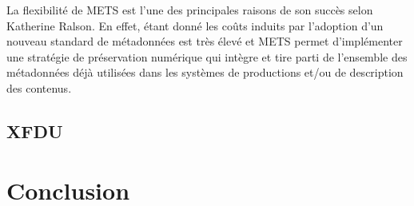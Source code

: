 \documentclass[12pt,a4paper]{article} %
\begin{document}
La flexibilité de METS est l'une des principales raisons de son succès selon Katherine Ralson. En effet, étant donné les coûts induits par l'adoption d'un nouveau standard de métadonnées est très élevé et METS permet d'implémenter une stratégie de préservation numérique qui intègre et tire parti de l'ensemble des métadonnées déjà utilisées dans les systèmes de productions et/ou de description des contenus\autocite{ralson_mets_2013}. 


\subsection{XFDU}

\section{Conclusion}


\printbibliography
\end{document}
